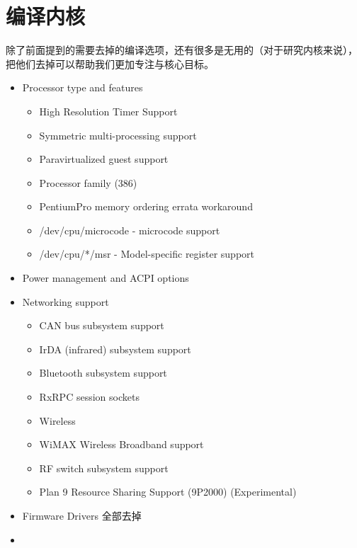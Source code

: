 \documentclass[b5paper,9pt,twoside,openany]{article}
\begin{document}
\section{编译内核}
除了前面提到的需要去掉的编译选项，还有很多是无用的（对于研究内核来说），把他们去掉可以帮助我们更加专注与核心目标。
\begin{itemize}
  \item Processor type and features
  \begin{itemize}
    \item High Resolution Timer Support
    \item Symmetric multi-processing support
    \item Paravirtualized guest support
    \item Processor family (386)
    \item PentiumPro memory ordering errata workaround
    \item /dev/cpu/microcode - microcode support
    \item /dev/cpu/*/msr - Model-specific register support
  \end{itemize}

  \item Power management and ACPI options 
  \begin{itemize}
    
  \end{itemize}

  \item Networking support
  \begin{itemize}
    \item CAN bus subsystem support
    \item IrDA (infrared) subsystem support
    \item Bluetooth subsystem support
    \item RxRPC session sockets
    \item Wireless
    \item WiMAX Wireless Broadband support
    \item RF switch subsystem support
    \item Plan 9 Resource Sharing Support (9P2000) (Experimental)
  \end{itemize}

  \item Firmware Drivers 全部去掉
  \item 
\end{itemize}
\end{document}
